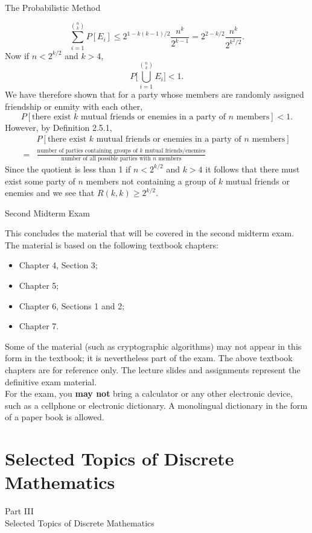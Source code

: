 \documentclass[smaller,hyperref={CJKbookmarks=true}]{beamer}
\begin{document}
\begin{frame}{The Probabilistic Method}
\begin{spacing}{1.05}
\[\sum_{i=1}^{\binom{n}{k}}P[E_i]\leq 2^{1-k(k-1)/2}\frac{n^k}{2^{k-1}}=2^{2-k/2}\frac{n^k}{2^{k^2/2}}.\]
Now if $n<2^{k/2}$ and $k>4$,
\[P\Big[\bigcup_{i=1}^{\binom{n}{k}}E_i\Big]<1.\]
\newpage
\vspace*{9pt}
We have therefore shown that for a party whose members are randomly
assigned friendship or enmity with each other,
\[P[\text{there exist $k$ mutual friends or enemies in a party of $n$ members}]<1.\]
However, by Definition 2.5.1,
\begin{align*}
  &P[\text{there exist $k$ mutual friends or enemies in a party of $n$ members}] \\
  =&\frac{\text{number of parties containing groups of $k$ mutual friends/enemies}}{\text{number of all possible parties with $n$ members}}
\end{align*}
Since the quotient is less than 1 if $n<2^{k/2}$ and $k>4$ it follows that there must exist some party of $n$ members not containing a group of $k$ mutual friends or enemies and we see that $R(k,k)\geq2^{k/2}$.
\end{spacing}
\end{frame}
\begin{frame}[c]{Second Midterm Exam}
\begin{spacing}{1.1}
This concludes the material that will be covered in the second midterm
exam. The material is based on the following textbook chapters:
\begin{itemize}
  \item Chapter 4, Section 3;
  \item Chapter 5;
  \item Chapter 6, Sections 1 and 2;
  \item Chapter 7.
\end{itemize}
Some of the material (such as cryptographic algorithms) may not appear
in this form in the textbook; it is nevertheless part of the exam. The
above textbook chapters are for reference only. The lecture slides and
assignments represent the definitive exam material.\\[6pt]
For the exam, you \textcolor[rgb]{1.00,0.00,0.00}{\textbf{may not}} bring a calculator or any other electronic
device, such as a cellphone or electronic dictionary. A monolingual
dictionary in the form of a paper book is allowed.
\end{spacing}
\end{frame}
\section{Selected Topics of Discrete Mathematics}
\begin{frame}
\begin{center}
  \LARGE{Part III}\\ \alert{Selected Topics of Discrete Mathematics}
\end{center}
\end{frame}
\begin{frame} \begin{spacing}{2.5}
\tableofcontents[currentsubsection,hideothersubsections,sectionstyle=hide]
\end{spacing}
\end{frame}
\end{document}
